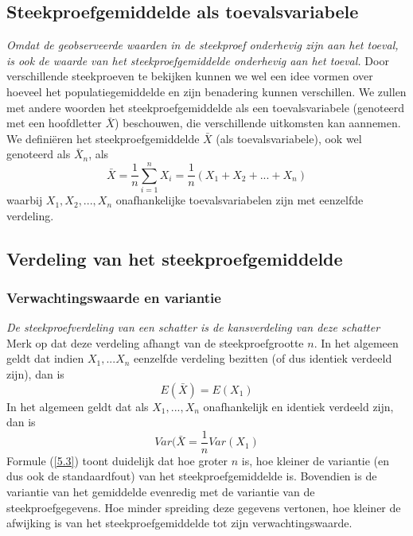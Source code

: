 \documentclass[titlepage]{article}
\numberwithin{equation}{section}
\begin{document}
\subsection{Steekproefgemiddelde als toevalsvariabele}
\emph{Omdat de geobserveerde waarden in de steekproef onderhevig zijn aan het toeval, is ook de waarde van het steekproefgemiddelde onderhevig aan het toeval.}\newline\newline
Door verschillende steekproeven te bekijken kunnen we wel een idee vormen over hoeveel het populatiegemiddelde en zijn benadering kunnen verschillen. We zullen met andere woorden het steekproefgemiddelde als een toevalsvariabele (genoteerd met een hoofdletter $\bar{X}$) beschouwen, die verschillende uitkomsten kan aannemen.\newline\newline
We definiëren het steekproefgemiddelde $\bar{X}$ (als toevalsvariabele), ook wel genoteerd als $\bar{X}_n$, als
\begin{equation}
	\bar{X}=\frac{1}{n}\sum\limits_{i=1}^n X_i = \frac{1}{n}(X_1+X_2+ ... +X_n)
	\label{5.1}
\end{equation}
waarbij $X_1,X_2, ... , X_n$ onafhankelijke toevalsvariabelen zijn met eenzelfde verdeling.
\subsection{Verdeling van het steekproefgemiddelde}
\subsubsection{Verwachtingswaarde en variantie}
\emph{De steekproefverdeling van een schatter is de kansverdeling van deze schatter}\newline\newline
Merk op dat deze verdeling afhangt van de steekproefgrootte $n$. In het algemeen geldt dat indien $X_1, ... X_n$ eenzelfde verdeling bezitten (of dus identiek verdeeld zijn), dan is
\begin{equation}
	E(\bar{X}) = E(X_1)
	\label{5.2}
\end{equation}
In het algemeen geldt dat als $X_1, ... , X_n$ onafhankelijk en identiek verdeeld zijn, dan is
\begin{equation}
	Var(\bar{X}=\frac{1}{n}Var(X_1)
	\label{5.3}
\end{equation}
Formule (\ref{5.3}) toont duidelijk dat hoe groter $n$ is, hoe kleiner de variantie (en dus ook de standaardfout) van het steekproefgemiddelde is. Bovendien is de variantie van het gemiddelde evenredig met de variantie van de steekproefgegevens. Hoe minder spreiding deze gegevens vertonen, hoe kleiner de afwijking is van het steekproefgemiddelde tot zijn verwachtingswaarde.
\end{document}
